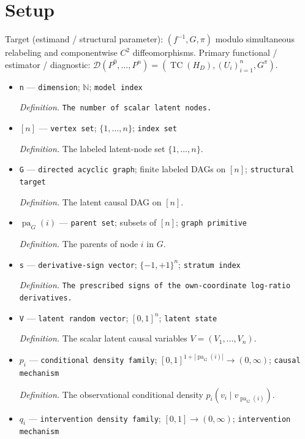 \documentclass{article}
\begin{document}
\section{Setup}

Target (estimand / structural parameter): \((f^{-1},G,\pi)\) modulo simultaneous relabeling and componentwise \(C^2\) diffeomorphisms.
Primary functional / estimator / diagnostic: \(\mathscr D(P^0,\ldots,P^n)=(\operatorname{TC}(H_D),(U_i)_{i=1}^{n},G^\pi)\).
\begin{itemize}
  \item \texttt{n} --- \texttt{dimension}; \(\mathbb N\); \texttt{model index}
  \par\smallskip\noindent\emph{Definition.} \texttt{The number of scalar latent nodes.}
  \item \([n]\) --- \texttt{vertex set}; \(\{1,\ldots,n\}\); \texttt{index set}
  \par\smallskip\noindent\emph{Definition.} The labeled latent-node set \(\{1,\ldots,n\}\).
  \item \texttt{G} --- \texttt{directed acyclic graph}; finite labeled DAGs on \([n]\); \texttt{structural target}
  \par\smallskip\noindent\emph{Definition.} The latent causal DAG on \([n]\).
  \item \(\operatorname{pa}_G(i)\) --- \texttt{parent set}; subsets of \([n]\); \texttt{graph primitive}
  \par\smallskip\noindent\emph{Definition.} The parents of node \(i\) in \(G\).
  \item \texttt{s} --- \texttt{derivative-\allowbreak{}sign vector}; \(\{-1,+1\}^{n}\); \texttt{stratum index}
  \par\smallskip\noindent\emph{Definition.} \texttt{The prescribed signs of the own-\allowbreak{}coordinate log-\allowbreak{}ratio derivatives.}
  \item \texttt{V} --- \texttt{latent random vector}; \([0,1]^n\); \texttt{latent state}
  \par\smallskip\noindent\emph{Definition.} The scalar latent causal variables \(V=(V_1,\ldots,V_n)\).
  \item \(p_i\) --- \texttt{conditional density family}; \([0,1]^{1+|\operatorname{pa}_G(i)|}\to(0,\infty)\); \texttt{causal mechanism}
  \par\smallskip\noindent\emph{Definition.} The observational conditional density \(p_i(v_i\mid v_{\operatorname{pa}_G(i)})\).
  \item \(q_i\) --- \texttt{intervention density family}; \([0,1]\to(0,\infty)\); \texttt{intervention mechanism}

\end{itemize}
\end{document}
